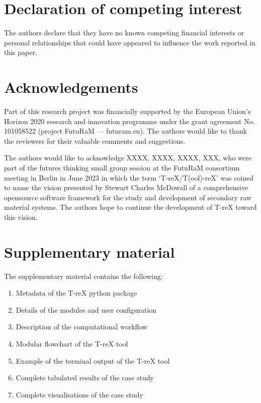\documentclass[review,3p,authoryear]{elsarticle}
\begin{document}
\section*{Declaration of competing interest}
The authors declare that they have no known competing financial interests or personal relationships that could have appeared to influence the work reported in this paper.

\section*{Acknowledgements}
Part of this research project was financially supported by the European Union's Horizon 2020 research and innovation programme under the grant agreement No. 101058522 (project FutuRaM --- futuram.eu). The authors would like to thank the reviewers for their valuable comments and suggestions.

The authors would like to acknowledge XXXX, XXXX, XXXX, XXX, who were part of the futures thinking small group session at the FutuRaM consortium meeting in Berlin in June 2023 in which the term `T-reX/T(ool)-reX' was coined to name the vision presented by Stewart Charles McDowall of a comprehensive opensource software framework for the study and development of secondary raw material systems. The authors hope to continue the development of T-reX toward this vision.   

\section*{Supplementary material}
    The supplementary material contains the following:
    \begin{enumerate}
        \item Metadata of the T-reX python package
        \item Details of the modules and user configuration
        \item Description of the computational workflow
        \item Modular flowchart of the T-reX tool
        \item Example of the terminal output of the T-reX tool
        \item Complete tabulated results of the case study
        \item Complete visualisations of the case study
    \end{enumerate}



    


\end{document}
